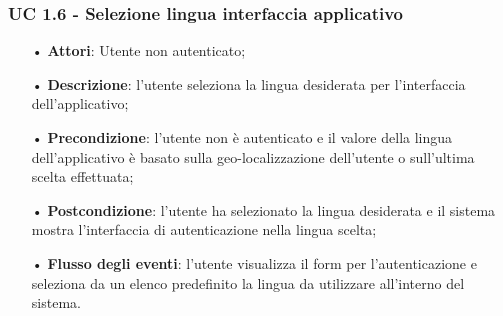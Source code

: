 \subsubsection{UC 1.6 - Selezione lingua interfaccia applicativo}
\begin{itemize}
\item[•]\textbf{Attori}: Utente non autenticato;
\item[•]\textbf{Descrizione}: l’utente seleziona la lingua desiderata per l'interfaccia dell'applicativo;
\item[•]\textbf{Precondizione}: l’utente non è autenticato e il valore della lingua dell'applicativo è basato sulla geo-localizzazione dell'utente o sull'ultima scelta effettuata;
\item[•]\textbf{Postcondizione}: l’utente ha selezionato la lingua desiderata e il sistema mostra l'interfaccia di autenticazione nella lingua scelta;
\item[•]\textbf{Flusso degli eventi}: l'utente visualizza il form per l'autenticazione e seleziona da un elenco predefinito la lingua da utilizzare all'interno del sistema.
\end{itemize}


